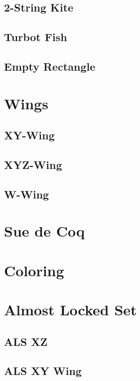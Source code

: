 \documentclass[accentcolor=tud6b,11pt,paper=a4]{tudreport}
\begin{document}
\newpage
\subsection{2-String Kite}

\newpage
\subsection{Turbot Fish}

\newpage
\subsection{Empty Rectangle}

\newpage
\section{Wings}

\newpage
\subsection{XY-Wing}

\newpage
\subsection{XYZ-Wing}

\newpage
\subsection{W-Wing}

\newpage
\section{Sue de Coq}

\newpage
\section{Coloring}

\newpage
\section{Almost Locked Set}

\newpage
\subsection{ALS XZ}

\newpage
\subsection{ALS XY Wing}
\end{document}
